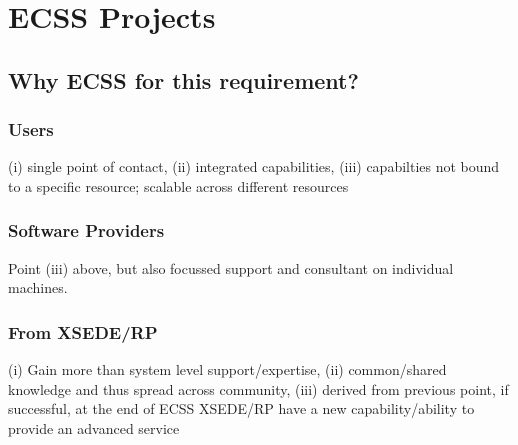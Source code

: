 \documentclass{sig-alternate}
\begin{document}
\section{ECSS Projects}

\subsection{Why ECSS for this requirement?}


\subsubsection{Users} (i) single point of contact, (ii) integrated capabilities,
(iii) capabilties not bound to a specific resource; scalable across
different resources

\subsubsection{Software Providers} Point (iii) above, but also focussed support and
consultant on individual machines.

\subsubsection{From XSEDE/RP} (i) Gain more than system level support/expertise, (ii)
common/shared knowledge and thus spread across community, (iii)
derived from previous point, if successful, at the end of ECSS
XSEDE/RP have a new capability/ability to provide an advanced service
\end{document}
